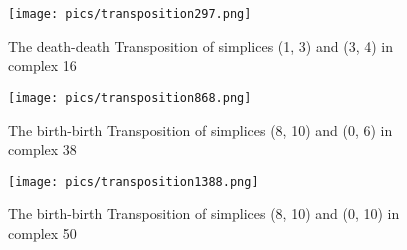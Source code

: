 \documentclass{article}
\begin{document}
\begin{figure}[ht]
\centering
\texttt{[image: pics/transposition297.png]}
\caption{The death-death Transposition of simplices (1, 3) and (3, 4) in complex 16}
\label{fig:unexpected297}
\end{figure}

\begin{figure}[ht]
\centering
\texttt{[image: pics/transposition868.png]}
\caption{The birth-birth Transposition of simplices (8, 10) and (0, 6) in complex 38}
\label{fig:unexpected868}
\end{figure}

\begin{figure}[ht]
\centering
\texttt{[image: pics/transposition1388.png]}
\caption{The birth-birth Transposition of simplices (8, 10) and (0, 10) in complex 50}
\label{fig:unexpected1388}
\end{figure}
\end{document}

